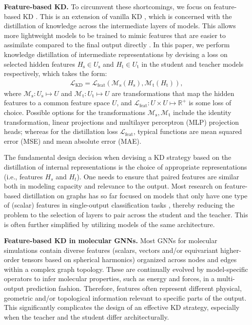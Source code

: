 \documentclass{article}
\newcommand{\loss}{\mathcal{L}}
\newcommand{\R}{\mathbb{R}} %
\begin{document}
\textbf{Feature-based KD.}
To circumvent these shortcomings, we focus on feature-based KD \cite{gou2021knowledge}. This is an extension of vanilla KD \cite{romero2015fitnets}, which is concerned with the distillation of knowledge across the intermediate layers of models. This allows more lightweight models to be trained to mimic features that are easier to assimilate compared to the final output directly \cite{aguilar2020knowledge}. In this paper, we perform knowledge distillation of intermediate representations by devising a loss on selected hidden features $H_\text{s} \in U_\text{s}$ and $H_\text{t} \in U_\text{t}$ in the student and teacher models respectively, which takes the form:
\begin{align}
\label{eq:kd_our}
    \loss_{\text{KD}} = \loss_{\text{feat}}(\mathcal{M}_\text{s}(H_\text{s}), \mathcal{M}_\text{t}(H_\text{t})),
\end{align}
where $\mathcal{M}_\text{s}: U_\text{s} \mapsto  U$ and $\mathcal{M}_\text{t}: U_\text{t} \mapsto U$ are transformations that map the hidden features to a common feature space $U$, and $\loss_{\text{feat}}: U \times U \mapsto \R^+$ is some loss of choice. Possible options for the transformations $\mathcal{M}_\text{s}, \mathcal{M}_\text{t}$ include the identity transformation, linear projections and multilayer perceptron (MLP) projection heads; whereas for the distillation loss $\loss_{\text{feat}}$, typical functions are mean squared error (MSE) and mean absolute error (MAE). 

The fundamental design decision when devising a KD strategy based on the distillation of internal representations is the choice of appropriate representations (i.e., features $H_s$ and $H_t$). One needs to ensure that paired features are similar both in modeling capacity and relevance to the output. Most research on feature-based distillation on graphs has so far focused on models that only have one type of (scalar) features in single-output classification tasks \cite{zhang2020reliable, he2022compressing, yu2022sail, huo2022t2}, thereby reducing the problem to the selection of layers to pair across the student and the teacher. This is often further simplified by utilizing models of the same architecture.

\textbf{Feature-based KD in molecular GNNs.} 
Most GNNs for molecular simulations contain diverse features (scalars, vectors and/or equivariant higher-order tensors based on spherical harmonics) organized across nodes and edges within a complex graph topology. These are continually evolved by model-specific operators to infer molecular properties, such as energy and forces, in a multi-output prediction fashion. Therefore, features often represent different physical, geometric and/or topological information relevant to specific parts of the output. This significantly complicates the design of an effective KD strategy, especially when the teacher and the student differ architecturally.
\end{document}
